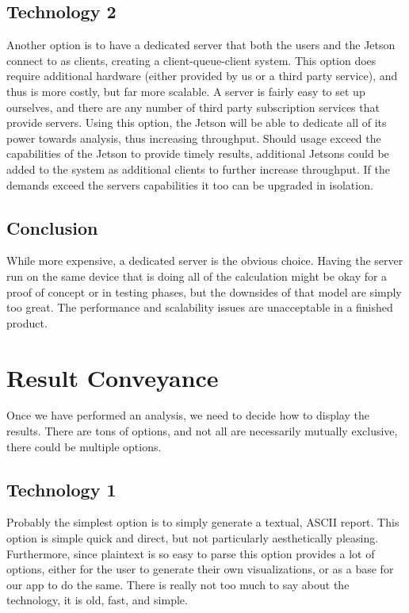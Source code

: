 \documentclass[onecolumn, draftclsnofoot,10pt, compsoc]{IEEEtran}
\begin{document}
\subsection{Technology 2}
Another option is to have a dedicated server that both the users and the Jetson connect to as clients, creating a client-queue-client system.
This option does require additional hardware (either provided by us or a third party service), and thus is more costly, but far more scalable.
A server is fairly easy to set up ourselves, and there are any number of third party subscription services that provide servers.
Using this option, the Jetson will be able to dedicate all of its power towards analysis, thus increasing throughput.
Should usage exceed the capabilities of the Jetson to provide timely results, additional Jetsons could be added to the system as additional clients to further increase throughput. If the demands exceed the servers capabilities it too can be upgraded in isolation.

\subsection{Conclusion}
While more expensive, a dedicated server is the obvious choice. Having the server run on the same device that is doing all of the calculation might be okay for a proof of concept or in testing phases, but the downsides of that model are simply too great. The performance and scalability issues are unacceptable in a finished product.

\section{Result Conveyance}
Once we have performed an analysis, we need to decide how to display the results. 
There are tons of options, and not all are necessarily mutually exclusive, there could be multiple options.

\subsection{Technology 1}
Probably the simplest option is to simply generate a textual, ASCII report.
This option is simple quick and direct, but not particularly aesthetically pleasing.
Furthermore, since plaintext is so easy to parse this option provides a lot of options, either for the user to generate their own visualizations, or as a base for our app to do the same. There is really not too much to say about the technology, it is old, fast, and simple.
\end{document}
